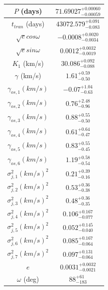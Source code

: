 \documentclass{article}
\begin{document}
\begin{table}
\centering
\begin{tabular}{| c | c |}
\hline
$P$ (days) & $71.69027^{+0.00060}_{-0.00059}$ \\
\hline
$t_{tran}$ (days) & $43072.579^{+0.091}_{-0.083}$ \\
\hline
$\sqrt{e} cos\omega$ & $-0.0008^{+0.0020}_{-0.0034}$ \\
\hline
$\sqrt{e} sin\omega$ & $0.0012^{+0.0032}_{-0.0019}$ \\
\hline
$K_1$ (km/s) & $30.086^{+0.092}_{-0.088}$ \\
\hline
$\gamma$ (km/s) & $1.61^{+0.59}_{-0.50}$ \\
\hline
$\gamma_{os,1} (km/s)$ & $-0.07^{+1.04}_{-0.63}$ \\
\hline
$\gamma_{os,2} (km/s)$ & $0.76^{+2.48}_{-0.96}$ \\
\hline
$\gamma_{os,3} (km/s)$ & $0.88^{+0.55}_{-0.50}$ \\
\hline
$\gamma_{os,4} (km/s)$ & $0.61^{+0.64}_{-0.47}$ \\
\hline
$\gamma_{os,5} (km/s)$ & $0.83^{+0.55}_{-0.45}$ \\
\hline
$\gamma_{os,6} (km/s)$ & $1.19^{+0.58}_{-0.54}$ \\
\hline
$\sigma^2_{j,1} (km/s)^2$ & $0.21^{+0.39}_{-0.16}$ \\
\hline
$\sigma^2_{j,2} (km/s)^2$ & $0.53^{+0.36}_{-0.38}$ \\
\hline
$\sigma^2_{j,3} (km/s)^2$ & $0.48^{+0.36}_{-0.35}$ \\
\hline
$\sigma^2_{j,4} (km/s)^2$ & $0.106^{+0.167}_{-0.077}$ \\
\hline
$\sigma^2_{j,5} (km/s)^2$ & $0.052^{+0.145}_{-0.040}$ \\
\hline
$\sigma^2_{j,6} (km/s)^2$ & $0.085^{+0.167}_{-0.064}$ \\
\hline
$\sigma^2_{j,7} (km/s)^2$ & $0.097^{+0.131}_{-0.064}$ \\
\hline
$e$ & $0.0031^{+0.0032}_{-0.0021}$ \\
\hline
$\omega$ (deg) & $88^{+61}_{-183}$ \\
\hline
\end{tabular}
\end{table}
\end{document}
